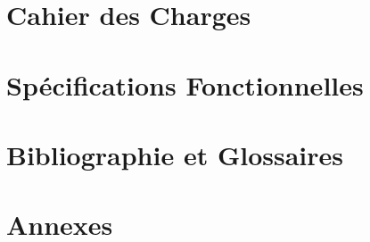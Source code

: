 \documentclass[a4paper, french]{report}
\begin{document}
\newpage
\pagestyle{empty}
\tableofcontents
{}
\pagestyle{plain}

\newpage




\part{Cahier des Charges}


\part{Spécifications Fonctionnelles}


\part{Bibliographie et Glossaires}


\part{Annexes}

\end{document}
